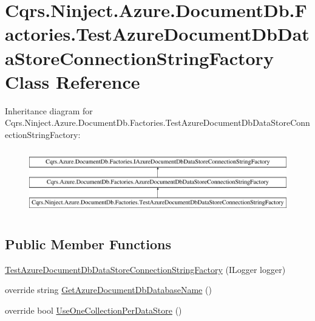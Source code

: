 \hypertarget{classCqrs_1_1Ninject_1_1Azure_1_1DocumentDb_1_1Factories_1_1TestAzureDocumentDbDataStoreConnectionStringFactory}{}\section{Cqrs.\+Ninject.\+Azure.\+Document\+Db.\+Factories.\+Test\+Azure\+Document\+Db\+Data\+Store\+Connection\+String\+Factory Class Reference}
\label{classCqrs_1_1Ninject_1_1Azure_1_1DocumentDb_1_1Factories_1_1TestAzureDocumentDbDataStoreConnectionStringFactory}
Inheritance diagram for Cqrs.\+Ninject.\+Azure.\+Document\+Db.\+Factories.\+Test\+Azure\+Document\+Db\+Data\+Store\+Connection\+String\+Factory\+:\begin{figure}[H]
\begin{center}
\leavevmode
\includegraphics[height=2.847458cm]{classCqrs_1_1Ninject_1_1Azure_1_1DocumentDb_1_1Factories_1_1TestAzureDocumentDbDataStoreConnectionStringFactory}
\end{center}
\end{figure}
\subsection*{Public Member Functions}
\begin{DoxyCompactItemize}
\item 
\hyperlink{classCqrs_1_1Ninject_1_1Azure_1_1DocumentDb_1_1Factories_1_1TestAzureDocumentDbDataStoreConnectionStringFactory_ad55763a7e19193cfecf2abca3759f2c6}{Test\+Azure\+Document\+Db\+Data\+Store\+Connection\+String\+Factory} (I\+Logger logger)
\item 
override string \hyperlink{classCqrs_1_1Ninject_1_1Azure_1_1DocumentDb_1_1Factories_1_1TestAzureDocumentDbDataStoreConnectionStringFactory_ab4b864396b790819609d3337dfb3f75d}{Get\+Azure\+Document\+Db\+Database\+Name} ()
\item 
override bool \hyperlink{classCqrs_1_1Ninject_1_1Azure_1_1DocumentDb_1_1Factories_1_1TestAzureDocumentDbDataStoreConnectionStringFactory_a3f802b2e647584bb96fdcdb532a149bb}{Use\+One\+Collection\+Per\+Data\+Store} ()
\end{DoxyCompactItemize}
